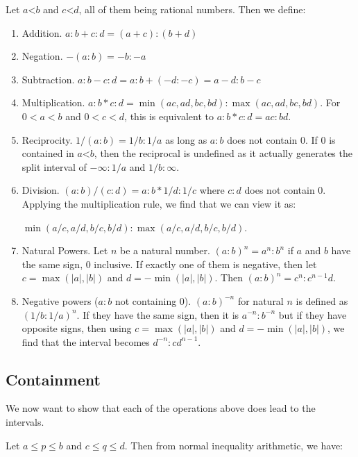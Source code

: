 \documentclass[12pt]{article}
\theoremstyle{remark}
\newcommand{\lt}{\mathord{<}}
\begin{document}
Let $a \lt b$ and $c \lt d$, all of them being rational numbers. Then we define:
\begin{enumerate}
    \item Addition. $a:b + c:d = (a+c):(b+d)$
    \item Negation. $-(a:b) = -b:-a$
    \item Subtraction. $a:b - c:d = a:b + (-d:-c) = a-d:b-c$
    \item Multiplication. $a:b * c:d = \min(ac, ad, bc, bd): \max(ac,ad,bc,bd)$. For $0<a<b$ and $0<c<d$, this is equivalent to $a:b*c:d = ac:bd$. 
    \item Reciprocity. $1/(a:b) = 1/b:1/a$ as long as $a:b$ does not contain 0. If 0 is contained in $a \lt b$, then the reciprocal is undefined as it actually generates the split interval of $-\infty:1/a$ and $1/b:\infty$. 
    \item Division. $(a:b) / (c:d) = a:b * 1/d:1/c$ where $c:d$ does not contain 0. Applying the multiplication rule, we find that we can view it as:
    
    $\min(a/c, a/d, b/c, b/d): \max(a/c,a/d,b/c,b/d)$. 
    \item Natural Powers. Let $n$ be a natural number. $(a:b)^n = a^n:b^n$ if $a$ and $b$ have the same sign, 0 inclusive. If exactly one of them is negative, then let $c = \max (|a|, |b|)$ and $d=-\min(|a|, |b|)$. Then $(a:b)^n = c^n: c^{n-1}d $. 
    \item Negative powers ($a:b$ not containing 0). $(a:b)^{-n}$ for natural $n$ is defined as $(1/b:1/a)^n$. If they have the same sign, then it is $a^{-n} : b^{-n}$ but if they have opposite signs, then using  $c = \max (|a|, |b|)$ and $d=-\min(|a|, |b|)$, we find that the interval becomes $d^{-n} : c d^{n-1}$. 
\end{enumerate}

\subsection{Containment}

We now want to show that each of the operations above does lead to the intervals. 

Let $a \leq p \leq b$ and $c\leq  q \leq  d$. Then from normal inequality arithmetic, we have: 
\end{document}
